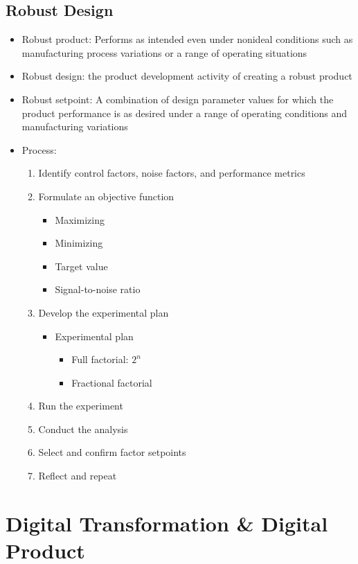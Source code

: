 \documentclass[openany,12pt,a4paper]{book}
\begin{document}
\section{Robust Design}
\begin{itemize}
    \item Robust product: Performs as intended even under nonideal conditions such as manufacturing process variations or a range of operating situations
    \item Robust design: the product development activity of creating a robust product
    \item Robust setpoint: A combination of design parameter values for which the product performance is as desired under a range of operating conditions and manufacturing variations
    \item Process:
    \begin{enumerate}
        \item Identify control factors, noise factors, and performance metrics
        \item Formulate an objective function
        \begin{itemize}
            \item Maximizing
            \item Minimizing
            \item Target value
            \item Signal-to-noise ratio
        \end{itemize}
        \item Develop the experimental plan
        \begin{itemize}
            \item Experimental plan
            \begin{itemize}
                \item Full factorial: $2^n$
                \item Fractional factorial
            \end{itemize}
        \end{itemize}
        \item Run the experiment
        \item Conduct the analysis
        \item Select and confirm factor setpoints
        \item Reflect and repeat
    \end{enumerate}
\end{itemize}

\chapter{Digital Transformation \& Digital Product}
\end{document}
